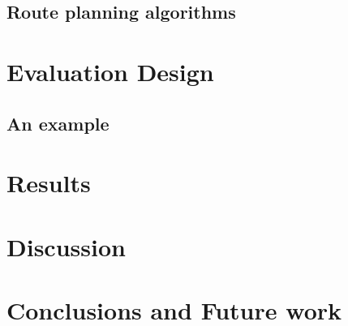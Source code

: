 \documentclass[sw]{iosart2x}
\begin{document}
\subsection{Route planning algorithms}

\section{Evaluation Design}
\subsection{An example}





\section{Results}

\section{Discussion}

\section{Conclusions and Future work}

\begin{acks}
	
\end{acks}




\end{document}
